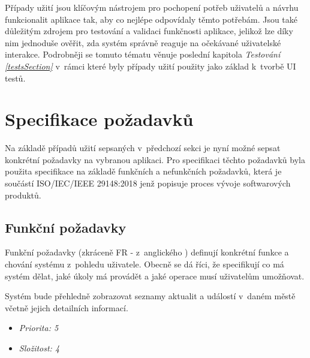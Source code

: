 \bigskip

Případy užití jsou klíčovým nástrojem pro pochopení potřeb uživatelů a návrhu funkcionalit aplikace tak, aby co nejlépe odpovídaly těmto potřebám. 
Jsou také důležitým zdrojem pro testování a validaci funkčnosti aplikace, jelikož lze díky nim jednoduše ověřit, zda systém správně reaguje na očekávané 
uživatelské interakce. Podrobněji se tomuto tématu věnuje poslední kapitola \textit{Testování \ref{testsSection}} v~rámci které byly případy užití
použity jako základ k~tvorbě UI testů.



\section{Specifikace požadavků}
Na základě případů užití sepsaných v~předchozí sekci je nyní možné sepsat konkrétní požadavky na vybranou aplikaci.
Pro specifikaci těchto požadavků byla použita specifikace na základě funkčních a nefunkčních požadavků, která je součástí ISO/IEC/IEEE 29148:2018
jenž popisuje proces vývoje softwarových produktů.

\subsection{Funkční požadavky}
Funkční požadavky (zkráceně FR - z~anglického ) definují konkrétní funkce a chování systému z~pohledu uživatele. Obecně se dá říci, že specifikují
co má systém dělat, jaké úkoly má provádět a jaké operace musí uživatelům umožňovat. 


Systém bude přehledně zobrazovat seznamy aktualit a událostí v~daném městě včetně jejich detailních informací.

\begin{itemize}
  \item \textit{Priorita: 5}
  \item \textit{Složitost: 4}
\end{itemize}


